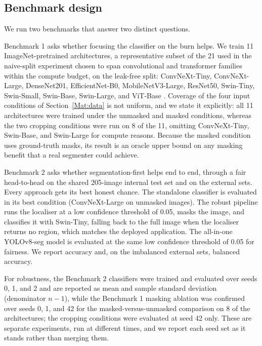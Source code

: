 \documentclass{elektr}
\begin{document}
\subsection{Benchmark design}
\label{Mat:bench}
We run two benchmarks that answer two distinct questions.

Benchmark 1 asks whether focusing the classifier on the burn helps. We train 11 ImageNet-pretrained architectures, a representative subset of the 21 used in the naive-split experiment chosen to span convolutional and transformer families within the compute budget, on the leak-free split: ConvNeXt-Tiny, ConvNeXt-Large, DenseNet201, EfficientNet-B0, MobileNetV3-Large, ResNet50, Swin-Tiny, Swin-Small, Swin-Base, Swin-Large, and ViT-Base \cite{convnext,densenet,efficientnet,mobilenet,resnet,swin,vit}. Coverage of the four input conditions of Section~\ref{Mat:data} is not uniform, and we state it explicitly: all 11 architectures were trained under the unmasked and masked conditions, whereas the two cropping conditions were run on 8 of the 11, omitting ConvNeXt-Tiny, Swin-Base, and Swin-Large for compute reasons. Because the masked condition uses ground-truth masks, its result is an oracle upper bound on any masking benefit that a real segmenter could achieve.

Benchmark 2 asks whether segmentation-first helps end to end, through a fair head-to-head on the shared 205-image internal test set and on the external sets. Every approach gets its best honest chance. The standalone classifier is evaluated in its best condition (ConvNeXt-Large on unmasked images). The robust pipeline runs the localiser at a low confidence threshold of 0.05, masks the image, and classifies it with Swin-Tiny, falling back to the full image when the localiser returns no region, which matches the deployed application. The all-in-one YOLOv8-seg model is evaluated at the same low confidence threshold of 0.05 for fairness. We report accuracy and, on the imbalanced external sets, balanced accuracy.

For robustness, the Benchmark 2 classifiers were trained and evaluated over seeds 0, 1, and 2 and are reported as mean and sample standard deviation (denominator $n-1$), while the Benchmark 1 masking ablation was confirmed over seeds 0, 1, and 42 for the masked-versus-unmasked comparison on 8 of the architectures; the cropping conditions were evaluated at seed 42 only. These are separate experiments, run at different times, and we report each seed set as it stands rather than merging them.
\end{document}
